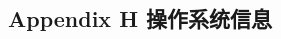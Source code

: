 \documentclass[class=book, crop=false]{standalone}
\begin{document}
\begin{CJK}{UTF8}{gbsn}

\chapter*{Appendix H 操作系统信息}





\cleardoublepage

\end{CJK}
\end{document}
